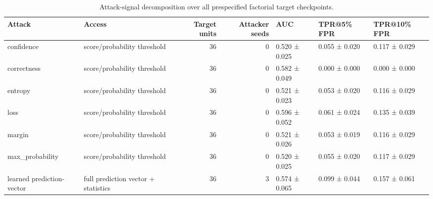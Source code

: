 \begin{table}[t]
\caption{Attack-signal decomposition over all prespecified factorial target checkpoints.}
\label{tab:attack-suite}
\begin{tabular}{llrrlll}
\toprule
Attack & Access & Target units & Attacker seeds & AUC & TPR@5\% FPR & TPR@10\% FPR \\
\midrule
confidence & score/probability threshold & 36 & 0 & 0.520 ± 0.025 & 0.055 ± 0.020 & 0.117 ± 0.029 \\
correctness & score/probability threshold & 36 & 0 & 0.582 ± 0.049 & 0.000 ± 0.000 & 0.000 ± 0.000 \\
entropy & score/probability threshold & 36 & 0 & 0.521 ± 0.023 & 0.053 ± 0.020 & 0.116 ± 0.029 \\
loss & score/probability threshold & 36 & 0 & 0.596 ± 0.052 & 0.061 ± 0.024 & 0.135 ± 0.039 \\
margin & score/probability threshold & 36 & 0 & 0.521 ± 0.026 & 0.053 ± 0.019 & 0.116 ± 0.029 \\
max\_probability & score/probability threshold & 36 & 0 & 0.520 ± 0.025 & 0.055 ± 0.020 & 0.117 ± 0.029 \\
learned prediction-vector & full prediction vector + statistics & 36 & 3 & 0.574 ± 0.065 & 0.099 ± 0.044 & 0.157 ± 0.061 \\
\bottomrule
\end{tabular}
\end{table}
